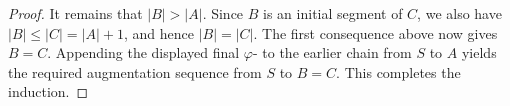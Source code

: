 \begin{proof}
It remains that \(|B|>|A|\).  Since \(B\) is an initial segment of \(C\),
we also have \(|B|\le |C|=|A|+1\), and hence \(|B|=|C|\).  The first
consequence above now gives \(B=C\).  Appending the displayed final
\(\varphi\)- to the earlier chain from \(S\)
to \(A\) yields the required augmentation sequence from \(S\) to \(B=C\).
This completes the induction.
\end{proof}
